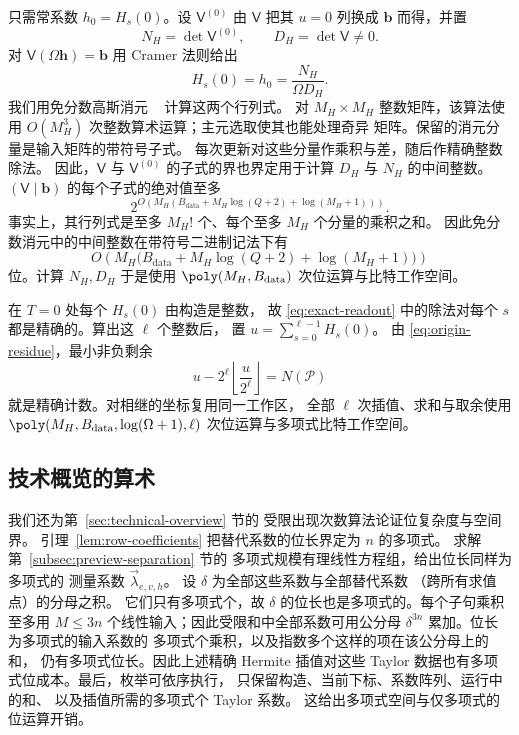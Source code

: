 只需常系数 $h_0=H_s(0)$。设 $\mathsf V^{(0)}$
由 $\mathsf V$ 把其 $u=0$ 列换成 $\mathbf b$
而得，并置
\[
 N_H=\det\mathsf V^{(0)},\qquad D_H=\det\mathsf V\ne0.
\]
对 $\mathsf V(\Omega\mathbf h)=\mathbf b$
用 Cramer 法则给出
\begin{equation}\label{eq:exact-readout}
 H_s(0)=h_0=\frac{N_H}{\Omega D_H}.
\end{equation}
我们用免分数高斯消元
~\cite[Sections~I--II and~IV--V]{Bareiss68}
计算这两个行列式。
对 $M_H\times M_H$ 整数矩阵，该算法使用
$O(M_H^3)$ 次整数算术运算；主元选取使其也能处理奇异
矩阵。保留的消元分量是输入矩阵的带符号子式。
每次更新对这些分量作乘积与差，随后作精确整数除法。
因此，$\mathsf V$ 与 $\mathsf V^{(0)}$
的子式的界也界定用于计算 $D_H$ 与 $N_H$
的中间整数。
$(\mathsf V\mid\mathbf b)$ 的每个子式的绝对值至多
\[
 2^{O\left(M_H\left(B_{\mathrm{data}}+
                M_H\log(Q+2)+\log(M_H+1)\right)\right)}.
\]
事实上，其行列式是至多 $M_H!$ 个、每个至多 $M_H$
个分量的乘积之和。
因此免分数消元中的中间整数在带符号二进制记法下有
\[
 O\!\left(M_H\bigl(B_{\mathrm{data}}+
                   M_H\log(Q+2)+\log(M_H+1)\bigr)\right)
\]
位。计算 $N_H,D_H$
于是使用 $\poly(M_H,B_{\mathrm{data}})$
次位运算与比特工作空间。

在 $T=0$ 处每个 $H_s(0)$ 由构造是整数，
故 \eqref{eq:exact-readout} 中的除法对每个 $s$
都是精确的。算出这 $\ell$ 个整数后，
置 $u=\sum_{s=0}^{\ell-1}H_s(0)$。
由 \eqref{eq:origin-residue}，最小非负剩余
\[
 u-2^\ell\left\lfloor\frac{u}{2^\ell}\right\rfloor=N(\mathcal P)
\]
就是精确计数。对相继的坐标复用同一工作区，
全部 $\ell$ 次插值、求和与取余使用
$\poly(M_H,B_{\mathrm{data}},\log(\Omega+1),\ell)$
次位运算与多项式比特工作空间。

\subsection{技术概览的算术}
\label{subsec:overview-arithmetic}
我们还为第~\ref{sec:technical-overview} 节的
受限出现次数算法论证位复杂度与空间界。
引理~\ref{lem:row-coefficients}
把替代系数的位长界定为 $n$ 的多项式。
求解第~\ref{subsec:preview-separation} 节的
多项式规模有理线性方程组，给出位长同样为多项式的
测量系数 $\vec\lambda_{e,v,h}$。
设 $\delta$ 为全部这些系数与全部替代系数
（跨所有求值点）的分母之积。
它们只有多项式个，故 $\delta$
的位长也是多项式的。每个子句乘积至多用 $M\le3n$
个线性输入；因此受限和中全部系数可用公分母
$\delta^{3n}$ 累加。位长为多项式的输入系数的
多项式个乘积，以及指数多个这样的项在该公分母上的和，
仍有多项式位长。因此上述精确 Hermite 插值对这些
Taylor 数据也有多项式位成本。最后，枚举可依序执行，
只保留构造、当前下标、系数阵列、运行中的和、
以及插值所需的多项式个 Taylor 系数。
这给出多项式空间与仅多项式的位运算开销。

\raggedbottom
